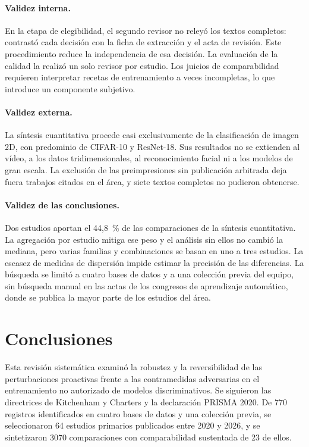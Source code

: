 \paragraph{Validez interna.} En la etapa de elegibilidad, el segundo revisor no releyó los textos completos: contrastó cada decisión con la ficha de extracción y el acta de revisión. Este procedimiento reduce la independencia de esa decisión. La evaluación de la calidad la realizó un solo revisor por estudio. Los juicios de comparabilidad requieren interpretar recetas de entrenamiento a veces incompletas, lo que introduce un componente subjetivo. 

\paragraph{Validez externa.} La síntesis cuantitativa procede casi exclusivamente de la clasificación de imagen 2D, con predominio de CIFAR-10 y ResNet-18. Sus resultados no se extienden al vídeo, a los datos tridimensionales, al reconocimiento facial ni a los modelos de gran escala. La exclusión de las preimpresiones sin publicación arbitrada deja fuera trabajos citados en el área, y siete textos completos no pudieron obtenerse.

\paragraph{Validez de las conclusiones.} Dos estudios aportan el 44,8~\% de las comparaciones de la síntesis cuantitativa. La agregación por estudio mitiga ese peso y el análisis sin ellos no cambió la mediana, pero varias familias y combinaciones se basan en uno a tres estudios. La escasez de medidas de dispersión impide estimar la precisión de las diferencias. La búsqueda se limitó a cuatro bases de datos y a una colección previa del equipo, sin búsqueda manual en las actas de los congresos de aprendizaje automático, donde se publica la mayor parte de los estudios del área.

\section{Conclusiones}\label{sec:conclusiones}

Esta revisión sistemática examinó la robustez y la reversibilidad de las perturbaciones proactivas frente a las contramedidas adversarias en el entrenamiento no autorizado de modelos discriminativos. Se siguieron las directrices de Kitchenham y Charters y la declaración PRISMA 2020. De 770 registros identificados en cuatro bases de datos y una colección previa, se seleccionaron 64 estudios primarios publicados entre 2020 y 2026, y se sintetizaron 3070 comparaciones con comparabilidad sustentada de 23 de ellos.

